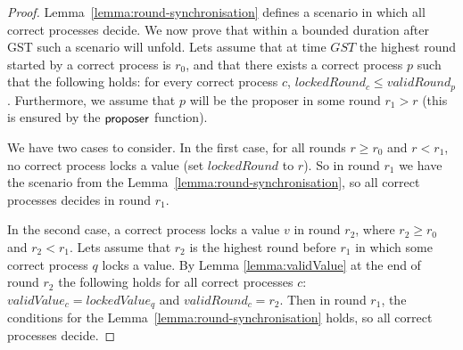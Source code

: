 \begin{proof} Lemma~\ref{lemma:round-synchronisation} defines a scenario in
    which all correct processes decide. We now prove that within a bounded
    duration after GST such a scenario will unfold. Lets assume that at time
    $GST$ the highest round started by a correct process is $r_0$, and that
    there exists a correct process $p$ such that the following holds: for every
    correct process $c$, $lockedRound_c \le validRound_p$. Furthermore, we
    assume that $p$ will be the proposer in some round $r_1 > r$ (this is
    ensured by the $\mathsf{proposer}$ function). 

We have two cases to consider. In the first case, for all rounds $r \ge r_0$
and $r < r_1$, no correct process locks a value (set $lockedRound$ to $r$). So
in round $r_1$ we have the scenario from the
Lemma~\ref{lemma:round-synchronisation}, so all correct processes decides in
round $r_1$.  

In the second case, a correct process locks a value $v$ in round $r_2$, where
$r_2 \ge r_0$ and $r_2 < r_1$.  Lets assume that $r_2$ is the highest round
before $r_1$ in which some correct process $q$ locks a value. By Lemma
\ref{lemma:validValue} at the end of round $r_2$ the following holds for all
correct processes $c$: $validValue_c = lockedValue_q$ and $validRound_c = r_2$.
Then in round $r_1$, the conditions for the
Lemma~\ref{lemma:round-synchronisation} holds, so all correct processes decide.
\end{proof}	

